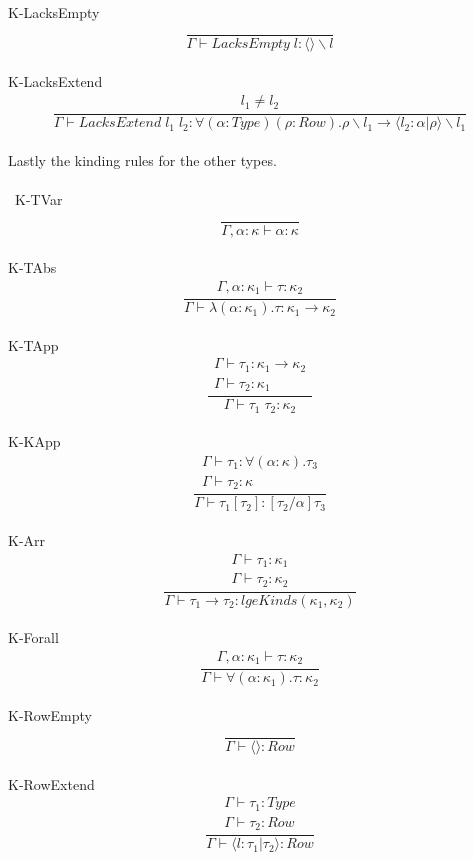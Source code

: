 \documentclass[12pt]{article}
\newcommand\llabel[0]{l}
\newcommand\kind[0]{\kappa} %
\newcommand\type[0]{\tau} %
\newcommand\tabs[3]{\lambda(#1 : #2) . #3} %
\newcommand\tapp[2]{#1 \; #2} %
\newcommand\tkapp[2]{#1 [ #2 ]} %
\newcommand\tarr[2]{#1 \rightarrow #2} %
\newcommand\tforall[3]{\forall(#1 : #2) . #3} %
\newcommand\tforalls[2]{\forall#1 . #2} %
\newcommand\tempty[0]{\langle\rangle} %
\newcommand\textend[3]{\langle#1:#2|#3\rangle} %
\newcommand\ttype[0]{\textit{Type}} %
\newcommand\trow[0]{\textit{Row}} %
\newcommand\clacks[2]{#1\backslash#2} %
\newcommand\pempty[1]{\textit{LacksEmpty} \; #1} %
\newcommand\pextend[2]{\textit{LacksExtend} \; #1 \; #2} %
\begin{document}
K-LacksEmpty \[\frac{
	\begin{array}{l}
	\end{array}
}{
	\Gamma \vdash \pempty{\llabel} : \clacks{\tempty}{\llabel}
}\]\\
K-LacksExtend \[\frac{
	\begin{array}{l}
	\llabel_1 \neq \llabel_2
	\end{array}
}{
	\Gamma \vdash \pextend{\llabel_1}{\llabel_2} : \tforalls{(\alpha : \ttype)(\rho : \trow)}{\tarr{\clacks{\rho}{\llabel_1}}{\clacks{\textend{\llabel_2}{\alpha}{\rho}}{\llabel_1}}}
}\]\\

Lastly the kinding rules for the other types. \\\\\
K-TVar \[\frac{
	\begin{array}{l}
	\end{array}
}{
	\Gamma , \alpha : \kind \vdash \alpha : \kind
}\]\\
K-TAbs \[\frac{
	\begin{array}{l}
	\Gamma , \alpha : \kind_1 \vdash \type  : \kind_2
	\end{array}
}{
	\Gamma \vdash \tabs{\alpha}{\kind_1}{\type} : \tarr{\kind_1}{\kind_2}
}\]\\
K-TApp \[\frac{
	\begin{array}{l}
	\Gamma \vdash \type_1  : \tarr{\kind_1}{\kind_2} \\
	\Gamma \vdash \type_2 : \kind_1
	\end{array}
}{
	\Gamma \vdash \tapp{\type_1}{\type_2} : \kind_2
}\]\\
K-KApp \[\frac{
	\begin{array}{l}
	\Gamma \vdash \type_1  : \tforall{\alpha}{\kind}{\type_3} \\
	\Gamma \vdash \type_2 : \kind
	\end{array}
}{
	\Gamma \vdash \tkapp{\type_1}{\type_2} : [\type_2/\alpha]\type_3
}\]\\
K-Arr \[\frac{
	\begin{array}{l}
	\Gamma \vdash \type_1  : \kind_1 \\
	\Gamma \vdash \type_2 : \kind_2
	\end{array}
}{
	\Gamma \vdash \tarr{\type_1}{\type_2} : \textit{lgeKinds}(\kind_1, \kind_2)
}\]\\
K-Forall \[\frac{
	\begin{array}{l}
	\Gamma , \alpha : \kind_1 \vdash \type  : \kind_2
	\end{array}
}{
	\Gamma \vdash \tforall{\alpha}{\kind_1}{\type} : \kind_2
}\]\\
K-RowEmpty \[\frac{
	\begin{array}{l}
	\end{array}
}{
	\Gamma \vdash \tempty : \trow
}\]\\
K-RowExtend \[\frac{
	\begin{array}{l}
	\Gamma \vdash \type_1 : \ttype \\
	\Gamma \vdash \type_2 : \trow
	\end{array}
}{
	\Gamma \vdash \textend{\llabel}{\type_1}{\type_2} : \trow
}\]\\
\end{document}
